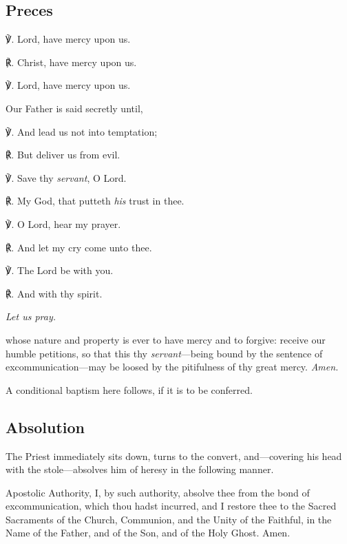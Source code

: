 \subsection{Preces}
℣. Lord, have mercy upon us.

℟. Christ, have mercy upon us.

℣. Lord, have mercy upon us.

\begin{rubric}
    Our Father is said secretly until,
\end{rubric}
℣. And lead us not into temptation;

℟. But deliver us from evil.

℣. Save thy \textit{servant}, O Lord.

℟. My God, that putteth \textit{his} trust in thee.

℣. O Lord, hear my prayer.

℟. And let my cry come unto thee.

℣. The Lord be with you.

℟. And with thy spirit.

\centerline{\textit{Let us pray.}}

 whose nature and property is ever to have mercy and to forgive: receive our humble petitions, so that this thy \textit{servant}---being bound by the sentence of excommunication---may be loosed by the pitifulness of thy great mercy. \textit{Amen.}

\vspace{-0.5ex}
\begin{rubric}
    A conditional baptism here follows, if it is to be conferred.
\end{rubric}

\subsection{Absolution}
\begin{rubric}
    The Priest immediately sits down, turns to the convert, and---covering his head with the stole---absolves him of heresy in the following manner.
\end{rubric}
 Apostolic Authority, I, by such authority, absolve thee from the bond of excommunication, which thou hadst incurred, and I restore thee to the Sacred Sacraments of the Church, Communion, and the Unity of the Faithful, in the Name of the Father, and of the Son, {} and of the Holy Ghost. Amen.

